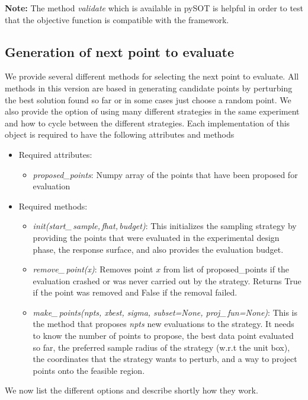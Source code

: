 \documentclass[]{article}
\begin{document}
\textbf{Note:} The method \textit{validate} which is available in pySOT is helpful 
in order to test that the objective function is compatible with the framework. \newline

\subsection{Generation of next point to evaluate} 
\label{search}
We provide several different methods for selecting the next point to evaluate. All 
methods in this version are based in generating candidate points by perturbing the 
best solution found so far or in some cases just choose a random point. We also 
provide the option of using many different strategies in the same experiment and 
how to cycle between the different strategies. Each implementation of this object 
is required to have the following attributes and methods
\begin{itemize}
\item[] {Required attributes}:
\begin{itemize}
\item \textit{proposed\_points}: Numpy array of the points that have been proposed 
for evaluation
\end{itemize}
\item[] {Required methods}:
\begin{itemize}
\item \textit{init(start\_\,sample,\,fhat,\,budget)}: This initializes the sampling strategy 
by providing the points that were evaluated in the experimental design phase, the 
response surface, and also provides  the evaluation budget.
\item \textit{remove\_\,point(x)}: Removes point $x$ from list of proposed\_points if 
the evaluation crashed or was never carried out by the strategy. Returns True if the 
point was removed and False if the removal failed.
\item \textit{make\_\,points(npts, xbest, sigma, subset=None, proj\_\,fun=None)}: 
This is the method that proposes \textit{npts} new evaluations to the strategy. It 
needs to know the number of points to propose, the best data point evaluated so 
far, the preferred sample radius of the strategy (w.r.t the unit box), the coordinates 
that the strategy wants to perturb, and a way to project points onto the feasible region. 
\end{itemize}
\end{itemize}
We now list the different options and describe shortly how they work.
\end{document}
